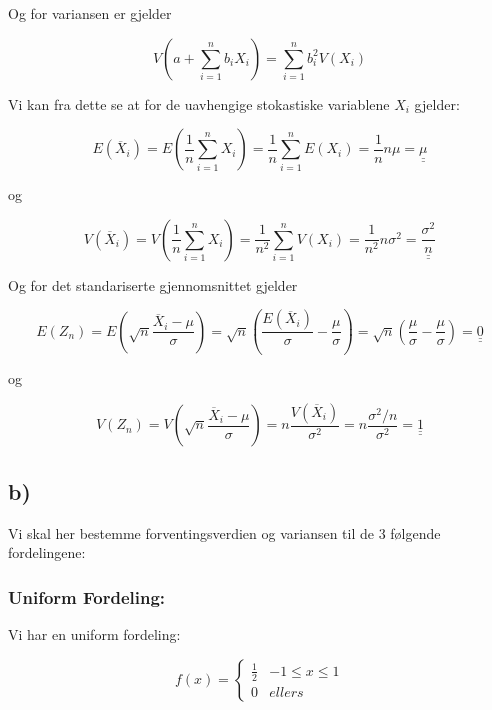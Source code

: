 \documentclass[a4paper,norsk, 10pt]{article}
\begin{document}
Og for variansen er gjelder

\begin{equation}
V\left(a + \sum_{i = 1}^n b_i X_i\right) = \sum_{i = 1}^n b_i^2 V(X_i)
\label{eq:Vlinear}
\end{equation}

Vi kan fra dette se at for de uavhengige stokastiske variablene $X_i$ gjelder:

\begin{equation}
E(\overline{X}_i) = E\left(\frac{1}{n}\sum_{i = 1}^n X_i\right) = \frac{1}{n}\sum_{i = 1}^n E(X_i) = \frac{1}{n}n\mu = \underline{\underline{\mu}}
\end{equation}

og

\begin{equation}
V(\overline{X}_i) =  V\left(\frac{1}{n}\sum_{i = 1}^n X_i\right) = \frac{1}{n^2}\sum_{i = 1}^n  V(X_i) = \frac{1}{n^2}n\sigma^2 = \underline{\underline{\frac{\sigma^2}{n}}}
\end{equation}

Og for det standariserte gjennomsnittet gjelder

\begin{equation}
E(Z_n) = E\left(\sqrt{n}\frac{\overline{X}_i - \mu}{\sigma}\right) = \sqrt{n}\left(\frac{E(\overline{X}_i)}{\sigma} - \frac{\mu}{\sigma}\right) = 
\sqrt{n}\left(\frac{\mu}{\sigma} - \frac{\mu}{\sigma}\right) = \underline{\underline{0}}
\end{equation}

og

\begin{equation}
V(Z_n) = V\left(\sqrt{n}\frac{\overline{X}_i - \mu}{\sigma}\right) = n\frac{V(\overline{X}_i)}{\sigma^2} = n\frac{\sigma^2/n}{\sigma^2} = \underline{\underline{1}}
\end{equation}

\subsection*{b)}

Vi skal her bestemme forventingsverdien og variansen til de 3 følgende fordelingene:

\subsubsection*{Uniform Fordeling:}

Vi har en uniform fordeling:

\begin{equation}
f(x) =
\begin{cases}
\frac{1}{2} & -1\leq x  \leq 1\\
0 & ellers
\end{cases}
\end{equation}
\end{document}
